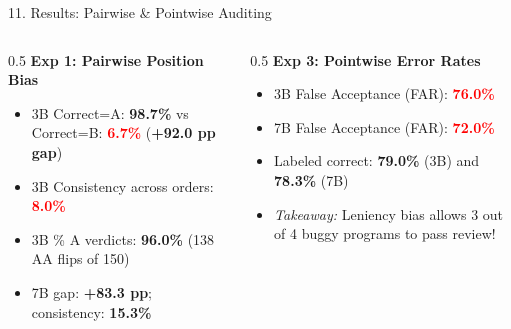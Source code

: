 \documentclass[aspectratio=169]{beamer}
\begin{document}
\begin{frame}{11. Results: Pairwise \& Pointwise Auditing}
  \begin{columns}
    \begin{column}{0.5\textwidth}
      \textbf{Exp 1: Pairwise Position Bias}
      \begin{itemize}
        \item 3B Correct=A: \textbf{98.7\%} vs Correct=B: \textcolor{red}{\textbf{6.7\%}} (\textbf{+92.0 pp gap})
        \item 3B Consistency across orders: \textcolor{red}{\textbf{8.0\%}}
        \item 3B \% A verdicts: \textbf{96.0\%} (138 AA flips of 150)
        \item 7B gap: \textbf{+83.3 pp}; consistency: \textbf{15.3\%}
      \end{itemize}
    \end{column}
    \begin{column}{0.5\textwidth}
      \textbf{Exp 3: Pointwise Error Rates}
      \begin{itemize}
        \item 3B False Acceptance (FAR): \textcolor{red}{\textbf{76.0\%}}
        \item 7B False Acceptance (FAR): \textcolor{red}{\textbf{72.0\%}}
        \item Labeled correct: \textbf{79.0\%} (3B) and \textbf{78.3\%} (7B)
        \item \emph{Takeaway:} Leniency bias allows 3 out of 4 buggy programs to pass review!
      \end{itemize}
    \end{column}
  \end{columns}
\end{frame}
\end{document}
